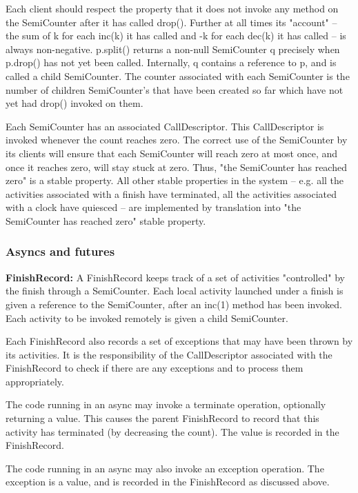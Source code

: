 \documentclass{article}
\begin{document}
Each client should respect the property that it does not invoke any
method on the SemiCounter after it has called drop(). Further at all
times its "account" -- the sum of k for each inc(k) it has called and
-k for each dec(k) it has called -- is always non-negative.  p.split()
returns a non-null SemiCounter q precisely when p.drop() has not yet
been called. Internally, q contains a reference to p, and is called a
child SemiCounter.  The counter associated with each SemiCounter is
the number of children SemiCounter's that have been created so far
which have not yet had drop() invoked on them.

Each SemiCounter has an associated CallDescriptor. This CallDescriptor
is invoked whenever the count reaches zero. The correct use of the
SemiCounter by its clients will ensure that each SemiCounter will
reach zero at most once, and once it reaches zero, will stay stuck at
zero. Thus, "the SemiCounter has reached zero" is a stable
property. All other stable properties in the system -- e.g. all the
activities associated with a finish have terminated, all the activities
associated with a clock have quiesced -- are implemented by
translation into "the SemiCounter has reached zero" stable property.

\subsubsection{Asyncs and futures}

\textbf{FinishRecord:}
 A FinishRecord keeps track of a set of activities "controlled" by the
 finish through a SemiCounter. Each local activity launched under a
 finish is given a reference to the SemiCounter, after an inc(1)
 method has been invoked. Each activity to be invoked remotely is given
 a child SemiCounter.  

 Each FinishRecord also records a set of exceptions that may have been
 thrown by its activities. It is the responsibility of the
 CallDescriptor associated with the FinishRecord to check if there are
 any exceptions and to process them appropriately.

The code running in an async may invoke a terminate operation,
optionally returning a value. This causes the parent FinishRecord to
record that this activity has terminated (by decreasing the
count). The value is recorded in the FinishRecord.

The code running in an async may also invoke an exception
operation. The exception is a value, and is recorded in the
FinishRecord as discussed above.
\end{document}

